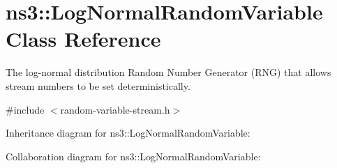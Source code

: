 \hypertarget{classns3_1_1LogNormalRandomVariable}{}\section{ns3\+:\+:Log\+Normal\+Random\+Variable Class Reference}
\label{classns3_1_1LogNormalRandomVariable}


The log-\/normal distribution Random Number Generator (R\+NG) that allows stream numbers to be set deterministically.  




{\ttfamily \#include $<$random-\/variable-\/stream.\+h$>$}



Inheritance diagram for ns3\+:\+:Log\+Normal\+Random\+Variable\+:


Collaboration diagram for ns3\+:\+:Log\+Normal\+Random\+Variable\+:
